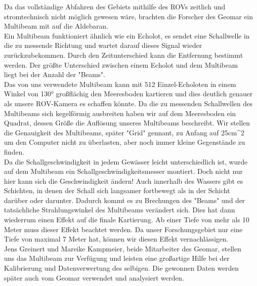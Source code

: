  

Da das vollständige Abfahren des Gebiets mithilfe des ROVs zeitlich und stromtechnisch nicht 
möglich gewesen wäre, brachten die Forscher des Geomar ein Multibeam mit auf die Aldebaran. \\

Ein Multibeam funktioniert ähnlich wie ein Echolot, es sendet eine Schallwelle in die zu messende 
Richtung und wartet darauf dieses Signal wieder zurückzubekommen. Durch den Zeitunterschied 
kann die Entfernung bestimmt werden. Der größte Unterschied zwischen einem Echolot und dem Multibeam 
liegt bei der Anzahl der "Beams". \\

Das von uns verwendete Multibeam kann mit 512 Einzel-Echoloten in einem Winkel von 130° großflächig den
Meeresboden kartieren und dies 
deutlich genauer als unsere ROV-Kamera es schaffen könnte. Da die zu messenden Schallwellen des Multibeams 
sich kegelförmig ausbreiten haben wir auf dem Meeresboden ein Quadrat, dessen Größe die Auflösung unseres Multibeams beschreibt.
Wir stellen die Genauigkeit des Multibeams, später "Grid" gennant, zu Anfang auf 25cm^2 um den Computer nicht zu überlasten, aber 
noch immer kleine Gegenstände zu finden.\\

Da die Schallgeschwindigkeit in jedem Gewässer leicht unterschiedlich ist, wurde auf dem Multibeam
ein Schallgeschwindigkeitsmesser montiert. Doch nicht nur hier kann sich die Geschwindigkeit ändern!
Auch innerhalb des Wassers gibt es Schichten, in denen der Schall sich langsamer fortbewegt als in
der Schicht darüber oder darunter. Dadurch kommt es zu Brechungen des "Beams" und der tatsächliche 
Strahlungswinkel des Multibeams verändert sich. Dies hat dann wiederrum einen Effekt auf die finale Kartierung.
Ab einer Tiefe von mehr als 10 Meter muss dieser Effekt beachtet werden. Da unser Forschungsgebiet nur eine 
Tiefe von maximal 7 Meter hat, können wir diesen Effekt vernachlässigen.\\

Jens Greinert und Mareike Kampmeier, beide Mitarbeiter des Geomar, stellen uns das Multibeam zur Verfügung und 
leisten eine großartige Hilfe bei der Kalibrierung und Datenverwertung des selbigen. Die gewonnen Daten werden 
später auch vom Geomar verwendet und analysiert werden. \\

